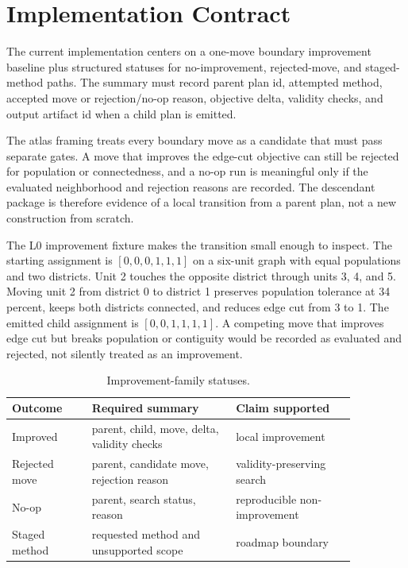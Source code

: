 \section{Implementation Contract}

The current implementation centers on a one-move boundary improvement baseline
plus structured statuses for no-improvement, rejected-move, and staged-method
paths. The summary must record parent plan id, attempted method, accepted move
or rejection/no-op reason, objective delta, validity checks, and output artifact
id when a child plan is emitted.

The atlas framing treats every boundary move as a candidate that must pass
separate gates. A move that improves the edge-cut objective can still be
rejected for population or connectedness, and a no-op run is meaningful only if
the evaluated neighborhood and rejection reasons are recorded. The descendant
package is therefore evidence of a local transition from a parent plan, not a
new construction from scratch.

The L0 improvement fixture makes the transition small enough to inspect. The
starting assignment is \([0,0,0,1,1,1]\) on a six-unit graph with equal
populations and two districts. Unit 2 touches the opposite district through
units 3, 4, and 5. Moving unit 2 from district 0 to district 1 preserves
population tolerance at 34 percent, keeps both districts connected, and reduces
edge cut from 3 to 1. The emitted child assignment is
\([0,0,1,1,1,1]\). A competing move that improves edge cut but breaks population
or contiguity would be recorded as evaluated and rejected, not silently treated
as an improvement.

\begin{table}[htbp]
\centering
\small
\begin{tabular}{p{0.20\linewidth}p{0.36\linewidth}p{0.30\linewidth}}
\toprule
Outcome & Required summary & Claim supported \\
\midrule
Improved & parent, child, move, delta, validity checks & local improvement \\
Rejected move & parent, candidate move, rejection reason & validity-preserving search \\
No-op & parent, search status, reason & reproducible non-improvement \\
Staged method & requested method and unsupported scope & roadmap boundary \\
\bottomrule
\end{tabular}
\caption{Improvement-family statuses.}
\end{table}

